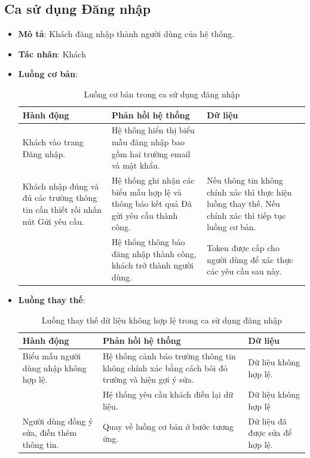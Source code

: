 \documentclass[./../main.tex]{subfiles}
\begin{document}
\subsection{Ca sử dụng Đăng nhập}
\begin{itemize}
    \item \textbf{Mô tả}: Khách đăng nhập thành người dùng của hệ thống.
    \item \textbf{Tác nhân}: Khách
    \item \textbf{Luồng cơ bản}:
    \begin{table}[H]
    \caption{\label{uc-4}Luồng cơ bản trong ca sử dụng đăng nhập}
    \begin{tabularx}{\textwidth}{| X | X | X |}
        \hline
        \textbf{Hành động} & \textbf{Phản hồi hệ thống} & \textbf{Dữ liệu} \\ \hline
        Khách vào trang Đăng nhập. & Hệ thống hiển thị biểu mẫu đăng nhập bao gồm hai trường email và mật khẩu. &
        \\ \hline
        Khách nhập đúng và đủ các trường thông tin cần thiết rồi nhấn nút Gửi yêu cầu. & Hệ thống ghi nhận các biểu mẫu hợp lệ và thông báo kết quả Đã gửi yêu cầu thành công. & Nếu thông tin không chính xác thì thực hiện luồng thay thế. Nếu chính xác thì tiếp tục luồng cơ bản.
        \\ \hline
        & Hệ thống thông báo đăng nhập thành công, khách trở thành người dùng. & Token được cấp cho người dùng để xác thực các yêu cầu sau này.
        \\ \hline
    \end{tabularx}
    \end{table}    
    \item \textbf{Luồng thay thế}:
        \begin{table}[H]
        \caption{\label{uc-5}Luồng thay thế dữ liệu không hợp lệ trong ca sử dụng đăng nhập}
        \begin{tabularx}{\textwidth}{| X | X | X |}
            \hline
            \textbf{Hành động} & \textbf{Phản hồi hệ thống} & \textbf{Dữ liệu} \\ \hline
            Biểu mẫu người dùng nhập không hợp lệ. & Hệ thống cảnh báo trường thông tin không chính xác bằng cách bôi đỏ trường và hiện gợi ý sửa. & Dữ liệu không hợp lệ.
            \\ \hline
            & Hệ thống yêu cầu khách điền lại dữ liệu. & Dữ liệu không hợp lệ
            \\ \hline
            Người dùng đồng ý sửa, điền thêm thông tin. & Quay về luồng cơ bản ở bước tương ứng. & Dữ liệu đã được sửa để hợp lệ.

\end{tabularx}
\end{table}
\end{itemize}
\end{document}
